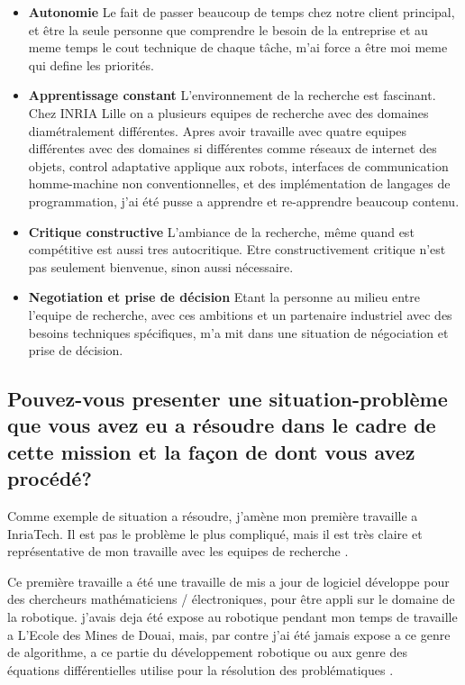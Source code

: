 \documentclass{resume} %
\begin{document}
			\begin{itemize} 				
			\item \textbf{Autonomie} \newline
				Le fait de passer beaucoup de temps chez notre client principal, et être la seule personne que comprendre le besoin de la entreprise et au meme temps le cout technique de chaque tâche, m'ai force a être moi meme qui define les priorités. 
			\item \textbf{Apprentissage constant } \newline
				L'environnement de la recherche est fascinant. Chez INRIA Lille on a plusieurs equipes de recherche avec des domaines diamétralement différentes. Apres avoir travaille avec quatre equipes différentes avec des domaines si différentes comme réseaux de internet des objets, control adaptative applique aux robots,  interfaces de communication homme-machine non conventionnelles, et des implémentation de langages de programmation, j'ai été pusse a apprendre et re-apprendre beaucoup contenu. 
			\item \textbf{Critique constructive} \newline
				L'ambiance de la recherche, même quand est compétitive est aussi tres autocritique. Etre constructivement critique n'est pas seulement bienvenue, sinon aussi nécessaire.
			\item \textbf{Negotiation et prise de décision } \newline
				Etant la personne au milieu entre l'equipe de recherche, avec ces ambitions et un partenaire industriel avec des besoins techniques spécifiques, m'a mit dans une situation de négociation  et prise de décision. 
		\end{itemize}

		
	\subsection{Pouvez-vous presenter une situation-problème que vous avez eu a résoudre dans le cadre de cette mission et la façon de dont vous avez procédé?}
	
		Comme exemple de situation a résoudre, j'amène mon première travaille a InriaTech. Il est pas le problème le plus compliqué, mais il est très claire et représentative de mon travaille avec les equipes de recherche .  
		
		 Ce première travaille a été une travaille de mis a jour de logiciel développe pour des chercheurs mathématiciens / électroniques, pour être appli sur le domaine de la robotique. 
		j'avais deja été expose au robotique pendant mon temps de travaille a L'Ecole des Mines de Douai, mais, par contre j'ai été jamais expose a ce genre de algorithme, a ce partie du développement robotique ou aux genre des équations différentielles utilise pour la résolution des problématiques . 
		
\end{document}

